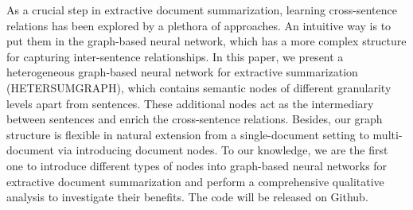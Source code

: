 As a crucial step in extractive document summarization,  learning cross-sentence relations has been explored by a plethora of approaches. An intuitive way is to put them in the graph-based neural network, which has a more complex structure for capturing inter-sentence relationships.  In this paper,  we present a heterogeneous graph-based neural network for extractive summarization (HETERSUMGRAPH), which contains semantic nodes of different granularity levels apart from sentences. These additional nodes act as the intermediary between sentences and enrich the cross-sentence relations. Besides, our graph structure is flexible in natural extension from a single-document setting to multi-document via introducing document nodes. To our knowledge, we are the first one to introduce different types of nodes into graph-based neural networks for extractive document summarization and perform a comprehensive qualitative analysis to investigate their benefits. The code will be released on Github.
